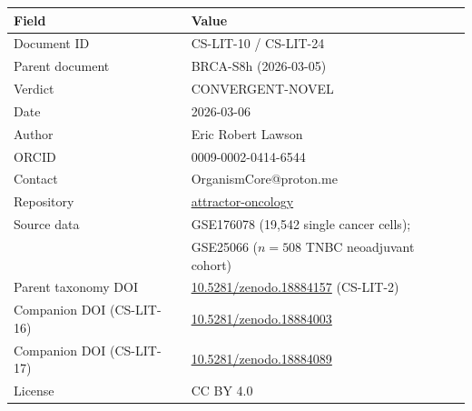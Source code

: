 \documentclass[12pt, a4paper]{article}
\begin{document}
\begin{tabular}{ll}
\toprule
\textbf{Field} & \textbf{Value} \\
\midrule
Document ID & CS-LIT-10 / CS-LIT-24 \\
Parent document & BRCA-S8h (2026-03-05) \\
Verdict & CONVERGENT-NOVEL \\
Date & 2026-03-06 \\
Author & Eric Robert Lawson \\
ORCID & 0009-0002-0414-6544 \\
Contact & OrganismCore@proton.me \\
Repository &
\href{https://github.com/Eric-Robert-Lawson/attractor-oncology}
{attractor-oncology} \\
Source data & GSE176078 (19,542 single cancer cells);\\
& GSE25066 ($n = 508$ TNBC neoadjuvant cohort) \\
Parent taxonomy DOI &
\href{https://doi.org/10.5281/zenodo.18884157}
{10.5281/zenodo.18884157} (CS-LIT-2) \\
Companion DOI (CS-LIT-16) &
\href{https://doi.org/10.5281/zenodo.18884003}
{10.5281/zenodo.18884003} \\
Companion DOI (CS-LIT-17) &
\href{https://doi.org/10.5281/zenodo.18884089}
{10.5281/zenodo.18884089} \\
License & CC BY 4.0 \\
\bottomrule
\end{tabular}
\end{document}
